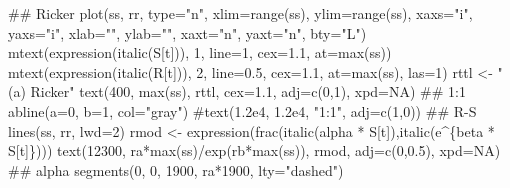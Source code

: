 \documentclass[11pt,]{article}
\newenvironment{Shaded}{}{}
\newcommand{\CommentTok}[1]{\textcolor[rgb]{0.00,0.50,0.00}{#1}}
\newcommand{\DataTypeTok}[1]{#1}
\newcommand{\DecValTok}[1]{#1}
\newcommand{\FloatTok}[1]{#1}
\newcommand{\KeywordTok}[1]{\textcolor[rgb]{0.00,0.00,1.00}{#1}}
\newcommand{\NormalTok}[1]{#1}
\newcommand{\OperatorTok}[1]{#1}
\newcommand{\OtherTok}[1]{\textcolor[rgb]{1.00,0.25,0.00}{#1}}
\newcommand{\StringTok}[1]{\textcolor[rgb]{0.00,0.50,0.50}{#1}}
\begin{document}
\begin{Shaded}
\begin{Highlighting}[]
\CommentTok{## Ricker}
\KeywordTok{plot}\NormalTok{(ss, rr, }\DataTypeTok{type=}\StringTok{"n"}\NormalTok{, }\DataTypeTok{xlim=}\KeywordTok{range}\NormalTok{(ss), }\DataTypeTok{ylim=}\KeywordTok{range}\NormalTok{(ss), }\DataTypeTok{xaxs=}\StringTok{"i"}\NormalTok{, }\DataTypeTok{yaxs=}\StringTok{"i"}\NormalTok{,}
     \DataTypeTok{xlab=}\StringTok{""}\NormalTok{, }\DataTypeTok{ylab=}\StringTok{""}\NormalTok{, }\DataTypeTok{xaxt=}\StringTok{"n"}\NormalTok{, }\DataTypeTok{yaxt=}\StringTok{"n"}\NormalTok{, }\DataTypeTok{bty=}\StringTok{"L"}\NormalTok{)}
\KeywordTok{mtext}\NormalTok{(}\KeywordTok{expression}\NormalTok{(}\KeywordTok{italic}\NormalTok{(S[t])), }\DecValTok{1}\NormalTok{, }\DataTypeTok{line=}\DecValTok{1}\NormalTok{, }\DataTypeTok{cex=}\FloatTok{1.1}\NormalTok{, }\DataTypeTok{at=}\KeywordTok{max}\NormalTok{(ss))}
\KeywordTok{mtext}\NormalTok{(}\KeywordTok{expression}\NormalTok{(}\KeywordTok{italic}\NormalTok{(R[t])), }\DecValTok{2}\NormalTok{, }\DataTypeTok{line=}\FloatTok{0.5}\NormalTok{, }\DataTypeTok{cex=}\FloatTok{1.1}\NormalTok{, }\DataTypeTok{at=}\KeywordTok{max}\NormalTok{(ss), }\DataTypeTok{las=}\DecValTok{1}\NormalTok{)}
\NormalTok{rttl <-}\StringTok{ "(a) Ricker"}
\KeywordTok{text}\NormalTok{(}\DecValTok{400}\NormalTok{, }\KeywordTok{max}\NormalTok{(ss), rttl, }\DataTypeTok{cex=}\FloatTok{1.1}\NormalTok{, }\DataTypeTok{adj=}\KeywordTok{c}\NormalTok{(}\DecValTok{0}\NormalTok{,}\DecValTok{1}\NormalTok{), }\DataTypeTok{xpd=}\OtherTok{NA}\NormalTok{)}
\CommentTok{## 1:1}
\KeywordTok{abline}\NormalTok{(}\DataTypeTok{a=}\DecValTok{0}\NormalTok{, }\DataTypeTok{b=}\DecValTok{1}\NormalTok{, }\DataTypeTok{col=}\StringTok{"gray"}\NormalTok{)}
\CommentTok{#text(1.2e4, 1.2e4, "1:1", adj=c(1,0))}
\CommentTok{## R-S}
\KeywordTok{lines}\NormalTok{(ss, rr, }\DataTypeTok{lwd=}\DecValTok{2}\NormalTok{)}
\NormalTok{rmod <-}\StringTok{ }\KeywordTok{expression}\NormalTok{(}\KeywordTok{frac}\NormalTok{(}\KeywordTok{italic}\NormalTok{(alpha }\OperatorTok{*}\StringTok{ }\NormalTok{S[t]),}\KeywordTok{italic}\NormalTok{(e}\OperatorTok{^}\NormalTok{\{beta }\OperatorTok{*}\StringTok{ }\NormalTok{S[t]\})))}
\KeywordTok{text}\NormalTok{(}\DecValTok{12300}\NormalTok{, ra}\OperatorTok{*}\KeywordTok{max}\NormalTok{(ss)}\OperatorTok{/}\KeywordTok{exp}\NormalTok{(rb}\OperatorTok{*}\KeywordTok{max}\NormalTok{(ss)), rmod, }\DataTypeTok{adj=}\KeywordTok{c}\NormalTok{(}\DecValTok{0}\NormalTok{,}\FloatTok{0.5}\NormalTok{), }\DataTypeTok{xpd=}\OtherTok{NA}\NormalTok{)}
\CommentTok{## alpha}
\KeywordTok{segments}\NormalTok{(}\DecValTok{0}\NormalTok{, }\DecValTok{0}\NormalTok{, }\DecValTok{1900}\NormalTok{, ra}\OperatorTok{*}\DecValTok{1900}\NormalTok{, }\DataTypeTok{lty=}\StringTok{"dashed"}\NormalTok{)}

\end{Highlighting}
\end{Shaded}
\end{document}

